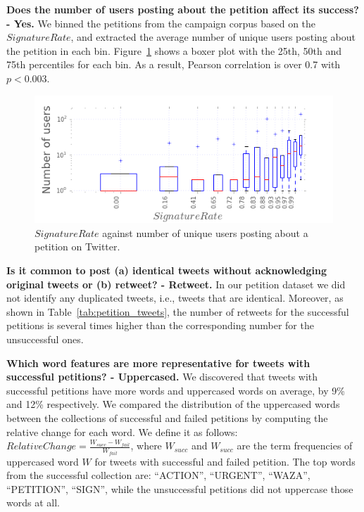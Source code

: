 \textbf{Does the number of users posting about the petition affect its success? - Yes.} We binned the petitions from the campaign corpus based on the $SignatureRate$, and extracted the average number of unique users posting about the petition in each bin. Figure~\ref{fig:signatures_vs_users} shows a boxer plot with the 25th, 50th and 75th percentiles for each bin. As a result, Pearson correlation is over 0.7 with \(p < 0.003\).

\begin{figure}
\centering
\includegraphics[width=\columnwidth]{figures/signaturesgoalVSnumusersCampaigns.png}
\caption{$SignatureRate$ against number of unique users posting about a petition on Twitter.}
\label{fig:signatures_vs_users}
\end{figure}

\textbf{Is it common to post (a) identical tweets without acknowledging original tweets or (b) retweet? - Retweet.} In our petition dataset we did not identify any duplicated tweets, i.e., tweets that are identical. Moreover, as shown in Table~\ref{tab:petition_tweets}, the number of retweets for the successful petitions is several times higher than the corresponding number for the unsuccessful ones.

\textbf{Which word features are more representative for tweets with successful petitions? - Uppercased.} We discovered that tweets with successful petitions have more words and uppercased words on average, by 9\% and 12\% respectively. We compared the distribution of the uppercased words between the collections of successful and failed petitions by computing the relative change for each word. We define it as follows: $RelativeChange = \frac{W_{succ} - W_{fail}}{W_{fail}}$, where $W_{succ}$ and $W_{succ}$ are the term frequencies of uppercased word $W$ for tweets with successful and failed petition. The top words from the successful collection are: ``ACTION'', ``URGENT'', ``WAZA'', ``PETITION'', ``SIGN'', while the unsuccessful petitions did not uppercase those words at all.
